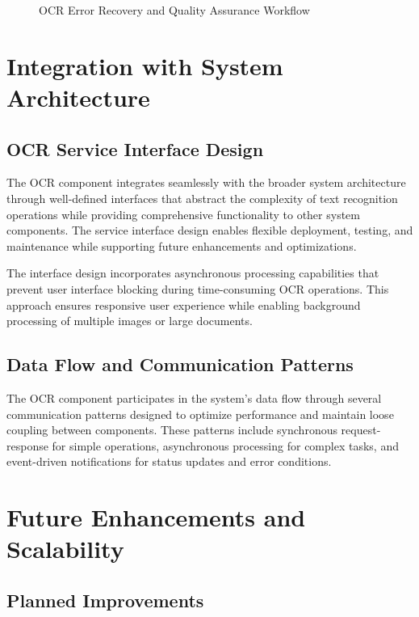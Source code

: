 \begin{table}[H]
\begin{table}[H]
\begin{table}[H]
\begin{figure}[H]
\begin{tikzpicture}
    \end{tikzpicture}
    \caption{OCR Error Recovery and Quality Assurance Workflow}
    \label{fig:error_recovery}
\end{figure}

\section{Integration with System Architecture}

\subsection{OCR Service Interface Design}

The OCR component integrates seamlessly with the broader system architecture through well-defined interfaces that abstract the complexity of text recognition operations while providing comprehensive functionality to other system components. The service interface design enables flexible deployment, testing, and maintenance while supporting future enhancements and optimizations.

The interface design incorporates asynchronous processing capabilities that prevent user interface blocking during time-consuming OCR operations. This approach ensures responsive user experience while enabling background processing of multiple images or large documents.

\subsection{Data Flow and Communication Patterns}

The OCR component participates in the system's data flow through several communication patterns designed to optimize performance and maintain loose coupling between components. These patterns include synchronous request-response for simple operations, asynchronous processing for complex tasks, and event-driven notifications for status updates and error conditions.


\section{Future Enhancements and Scalability}

\subsection{Planned Improvements}


\end{table}
\end{table}
\end{table}

